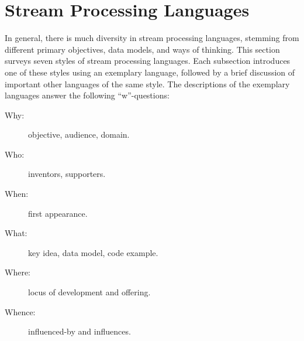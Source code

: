 \section{Stream Processing Languages}\label{sec:languages}

In general, there is much diversity in stream processing languages,
stemming from different primary objectives, data models, and ways of
thinking. This section surveys seven styles of stream processing languages.  Each
subsection introduces one of these styles using an exemplary language, followed by a
brief discussion of important other languages of the same style. The
descriptions of the exemplary languages answer the following
``w''-questions:

\begin{description}
  \item[Why:] objective, audience, domain.
  \item[Who:] inventors, supporters.
  \item[When:] first appearance.
  \item[What:] key idea, data model, code example.
  \item[Where:] locus of development and offering.
  \item[Whence:] influenced-by and influences.
\end{description}











